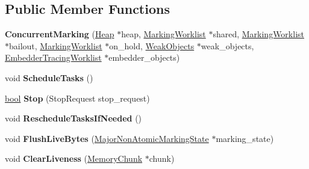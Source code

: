 \subsection*{Public Member Functions}
\begin{DoxyCompactItemize}
\item 
\mbox{\label{classv8_1_1internal_1_1ConcurrentMarking_ad0fab9e42c1617358bc81e7563fdfbc5}} 
{\bfseries Concurrent\+Marking} (\mbox{\hyperlink{classv8_1_1internal_1_1Heap}{Heap}} $\ast$heap, \mbox{\hyperlink{classv8_1_1internal_1_1Worklist}{Marking\+Worklist}} $\ast$shared, \mbox{\hyperlink{classv8_1_1internal_1_1Worklist}{Marking\+Worklist}} $\ast$bailout, \mbox{\hyperlink{classv8_1_1internal_1_1Worklist}{Marking\+Worklist}} $\ast$on\+\_\+hold, \mbox{\hyperlink{structv8_1_1internal_1_1WeakObjects}{Weak\+Objects}} $\ast$weak\+\_\+objects, \mbox{\hyperlink{classv8_1_1internal_1_1Worklist}{Embedder\+Tracing\+Worklist}} $\ast$embedder\+\_\+objects)
\item 
\mbox{\label{classv8_1_1internal_1_1ConcurrentMarking_af006221aa81108fbce1d278f35f951e6}} 
void {\bfseries Schedule\+Tasks} ()
\item 
\mbox{\label{classv8_1_1internal_1_1ConcurrentMarking_ae53fd45450b62fc0edd137c9d5d89387}} 
\mbox{\hyperlink{classbool}{bool}} {\bfseries Stop} (Stop\+Request stop\+\_\+request)
\item 
\mbox{\label{classv8_1_1internal_1_1ConcurrentMarking_a51ee38e4186ebfe81604e6f17b085334}} 
void {\bfseries Reschedule\+Tasks\+If\+Needed} ()
\item 
\mbox{\label{classv8_1_1internal_1_1ConcurrentMarking_aba18d9004a203020413436da69fd25c7}} 
void {\bfseries Flush\+Live\+Bytes} (\mbox{\hyperlink{classv8_1_1internal_1_1MajorNonAtomicMarkingState}{Major\+Non\+Atomic\+Marking\+State}} $\ast$marking\+\_\+state)
\item 
\mbox{\label{classv8_1_1internal_1_1ConcurrentMarking_a1dd36a40979f8de1ebf7ff0bb880c1f4}} 
void {\bfseries Clear\+Liveness} (\mbox{\hyperlink{classv8_1_1internal_1_1MemoryChunk}{Memory\+Chunk}} $\ast$chunk)

\end{DoxyCompactItemize}
